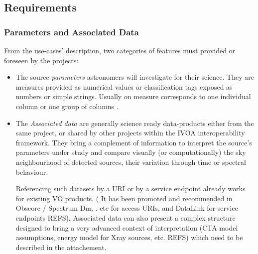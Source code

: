 \documentclass[11pt,a4paper]{ivoa}
\begin{document}
\subsection{Requirements}

\subsubsection{Parameters and Associated Data}
From the use-cases' description, two categories of features must provided or foreseen by the projects:

  \begin{itemize}
    \item The source \emph{parameters} astronomers will investigate for their science. They are measures provided as numerical values or classification tags exposed as numbers or simple strings. Usually on measure corresponds to one individual column or one group of columns .
     \item The \emph{Associated data} are generally science ready data-products either from the same project, or shared by other projects within the IVOA interoperability framework.
They bring a complement of information to interpret the source's  parameters under study and compare visually (or computationally) the sky neighbourhood of detected sources, their variation through time or spectral behaviour.

Referencing such datasets by a URI or by a service endpoint already works for existing VO products. ( It has been promoted and recommended in Obscore / Spectrum Dm, . etc for access URIs, and DataLink for service endpoints REFS).
Associated data can also present a complex structure designed to bring a very advanced context of interpretation (CTA model assumptions, energy model for Xray sources, etc. REFS) which need to be described in the attachement.
 \end{itemize}
\end{document}
